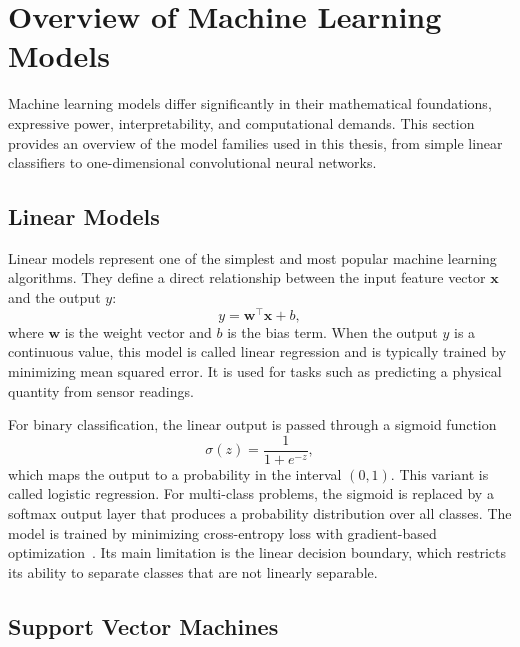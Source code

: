 \section{Overview of Machine Learning Models}
Machine learning models differ significantly in their mathematical foundations, expressive power, interpretability, and computational demands. This section provides an overview of the model families used in this thesis, from simple linear classifiers to one-dimensional convolutional neural networks.

\subsection{Linear Models}
\label{sec:linear_models}

Linear models represent one of the simplest and most popular machine learning algorithms. They define a direct relationship between the input feature vector $\mathbf{x}$ and the output $y$:
\begin{equation}
  y = \mathbf{w}^\top \mathbf{x} + b,
\end{equation}
where $\mathbf{w}$ is the weight vector and $b$ is the bias term. When the output $y$ is a continuous value, this model is called linear regression and is typically trained by minimizing mean squared error. It is used for tasks such as predicting a physical quantity from sensor readings.
 
For binary classification, the linear output is passed through a sigmoid function
\begin{equation}
  \sigma(z) = \frac{1}{1 + e^{-z}},
\end{equation}
which maps the output to a probability in the interval $(0, 1)$. This variant is called logistic regression. For multi-class problems, the sigmoid is replaced by a softmax output layer that produces a probability distribution over all classes. The model is trained by minimizing cross-entropy loss with gradient-based optimization~\cite{bishop2006prml}. Its main limitation is the linear decision boundary, which restricts its ability to separate classes that are not linearly separable.

\subsection{Support Vector Machines}

